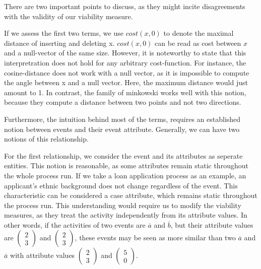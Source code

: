 \documentclass[./../../paper.tex]{subfiles}
\begin{document}
There are two important points to discuss, as they might incite disagreements with the validity of our viability measure. 

If we assess the first two terms, we use $cost(x,0)$ to denote the maximal distance of inserting and deleting x. $cost(x,0)$ can be read as cost between $x$ and a null-vector of the same size. However, it is noteworthy to state that this interpretration does not hold for any arbitrary cost-function. For instance, the cosine-distance does not work with a null vector, as it is impossible to compute the angle between x and a null vector. Here, the maximum distance would just amount to 1. In contrast, the family of \Gls{minkowski} works well with this notion, because they compute a distance between two points and not two directions. 

Furthermore, the intuition behind most of the terms, requires an established notion between events and their event attribute. Generally, we can have two notions of this relationship. 

For the first relationship, we consider the event and its attributes as seperate entities. This notion is reasonable, as some attributes remain static throughout the whole process run. If we take a loan application process as an example, an applicant's ethnic background does not change regardless of the event. This characteristic can be considered a case attribute, which remains static throughout the process run. This understanding would require us to modify the viability measures, as they treat the activity independently from its attribute values. In other words, if the activities of two events are $\overline{a}$ and $\overline{b}$, but their attribute values are $\left(\begin{smallmatrix}2 \\ 3\end{smallmatrix}\right)$ and $\left(\begin{smallmatrix}2 \\ 3\end{smallmatrix}\right)$, these events may be seen as more similar than two $\overline{a}$ and $\overline{a}$ with attribute values $\left(\begin{smallmatrix}2 \\ 3\end{smallmatrix}\right)$ and $\left(\begin{smallmatrix}5 \\ 0\end{smallmatrix}\right)$. 
\end{document}
